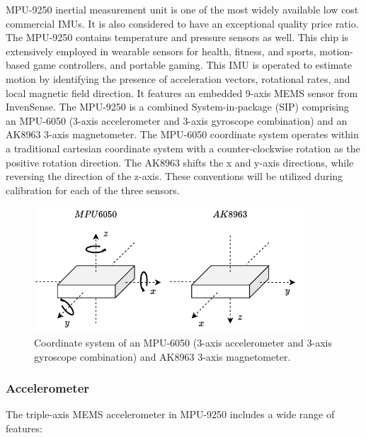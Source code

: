 MPU-9250 inertial measurement unit is one of the most widely available low cost commercial IMUs. It is also considered to have an exceptional quality price ratio. The MPU-9250 contains temperature and pressure sensors as well. This chip is extensively employed in wearable sensors for health, fitness, and sports, motion-based game controllers, and portable gaming. This IMU is operated to estimate motion by identifying the presence of acceleration vectors, rotational rates, and local magnetic field direction. It features an embedded 9-axis MEMS sensor from InvenSense. The MPU-9250 is a combined System-in-package (SIP) comprising an MPU-6050 (3-axis accelerometer and 3-axis gyroscope combination) and an AK8963 3-axis magnetometer. The MPU-6050 coordinate system operates within a traditional cartesian coordinate system with a counter-clockwise rotation as the positive rotation direction. The AK8963 shifts the x and y-axis directions, while reversing the direction of the z-axis. These conventions will be utilized during calibration for each of the three sensors.

\begin{figure}[!h]
  \centering
  \includegraphics[width=0.9\textwidth]{figures/mpu_orientation.pdf}
  \caption{ Coordinate system of an MPU-6050 (3-axis accelerometer and 3-axis gyroscope combination) and AK8963 3-axis magnetometer. }
  \label{fig:mpu_orientation}
\end{figure}

\subsubsection{Accelerometer}

The triple-axis MEMS accelerometer in MPU-9250 includes a wide range of features:

